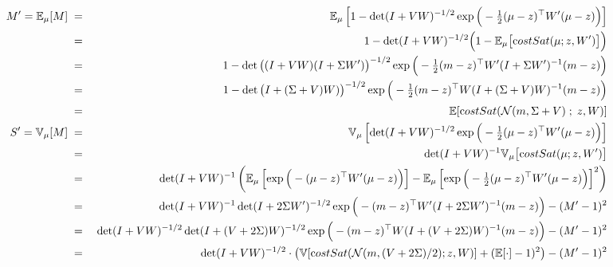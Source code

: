\documentclass[a4paper,10pt]{article}
\newcommand{\E}{\mathbb{E}}
\newcommand{\V}{\mathbb{V}}
\newcommand{\N}{\mathcal{N}}
\newcommand{\inv}{^{-1}}
\newcommand{\T}{^{\top}}
\begin{document}
\begin{eqnarray}
 M' = \E_\mu[M]
 &\;=\;& \E_\mu\left[1-\det(I+V W)^{-1/2}\exp\Big(-\tfrac{1}{2}(\mu-z)\T W' (\mu-z)\Big)\right] \\
 &\;=\;& 1-\det(I+V W)^{-1/2} \Big(1-\E_\mu\big[{\text costSat}(\mu;z,W')\big]\Big) \\
 &\;=\;& 1-\det\big((I+V W)(I+\Sigma W')\big)^{-1/2} \exp\Big(-\tfrac{1}{2}(m-z)\T W' (I + \Sigma W')\inv (m-z)\Big) \\
 &\;=\;& 1-\det\big(I+(\Sigma+V)W)\big)^{-1/2} \exp\Big(-\tfrac{1}{2}(m-z)\T W(I+(\Sigma+V)W)\inv (m-z)\Big) \\
 &\;=\;& \E[{\text costSat}(\N(m,\Sigma+V)\;;\;z,W)] \\
 S' = \V_\mu[M]
 &\;=\;& \V_\mu\left[\det(I+V W)^{-1/2} \exp\Big(-\tfrac{1}{2}(\mu-z)\T W' (\mu-z)\Big)\right] \\
 &\;=\;& \det(I+V W)\inv\V_\mu\big[{\text costSat}(\mu;z,W')\big] \\
 &\;=\;& \det(I+V W)^{-1}\left(\E_\mu\left[\exp\Big(-(\mu-z)\T W' (\mu-z)\Big)\right] - \E_\mu\left[\exp\Big(-\tfrac{1}{2}(\mu-z)\T W' (\mu-z)\Big)\right]^2\right)\\ %
 &\;=\;& \det(I+V W)^{-1}\det(I+2\Sigma W')^{-1/2}\exp\Big(-(m-z)\T W'(I+2\Sigma W')\inv(m-z)\Big) - (M'-1)^2 \\
 &\;=\;& \det(I+V W)^{-1/2} \det(I+(V+2\Sigma) W)^{-1/2}\exp\Big(-(m-z)\T W(I+(V+2\Sigma)W)\inv(m-z)\Big) - (M'-1)^2 \\
 &\;=\;& \det(I+V W)^{-1/2} \cdot \left(\V[{\text costSat}(\N(m,(V+2\Sigma)/2);z,W)] + (\E[\cdot]-1)^2 \right) - (M'-1)^2 \\

\end{eqnarray}
\end{document}
